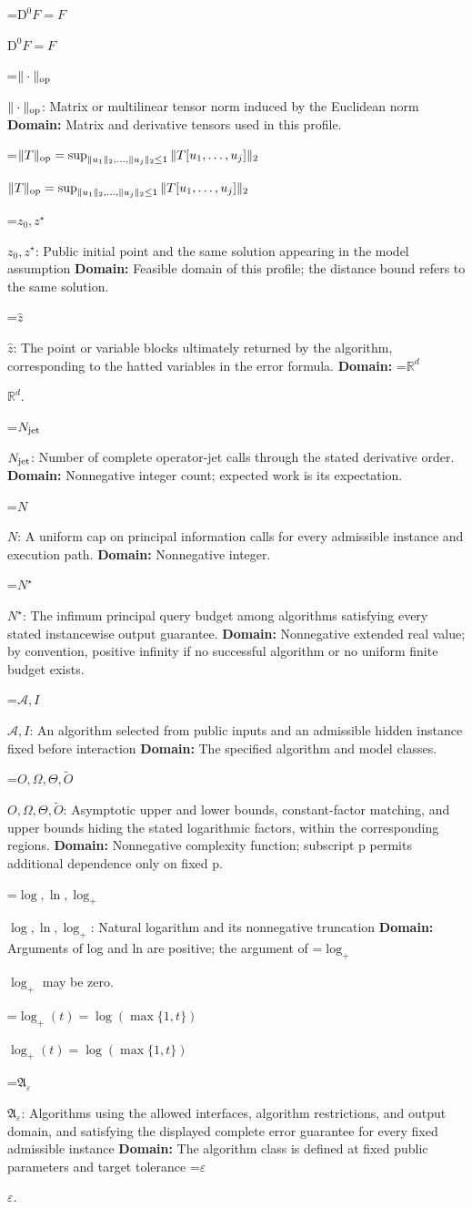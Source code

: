\documentclass[10pt,a4paper]{article}
\newcommand{\AtlasMath}[1]{\par\begingroup\centering\setbox0=\hbox{$\displaystyle #1$}\ifdim\wd0>1.4\linewidth\typeout{ATLAS WIDE FORMULA: \the\wd0}\fi\ifdim\wd0>\linewidth\resizebox{\linewidth}{!}{\box0}\else\box0\fi\par\endgroup}
\newcommand{\AtlasInlineMath}[1]{\begingroup\setbox0=\hbox{$#1$}\ifdim\wd0>.4\linewidth\endgroup\AtlasMath{#1}\else\endgroup$#1$\fi}
\begin{document}
\AtlasInlineMath{\mathrm D^0F=F}

\AtlasInlineMath{\|\cdot\|_{\rm op}}: Matrix or multilinear tensor norm induced by the Euclidean norm \textbf{Domain:} Matrix and derivative tensors used in this profile.

\AtlasInlineMath{\|T\|_{\rm op}=\sup_{\|u_1\|_2,\ldots,\|u_j\|_2\le1}\|T[u_1,\ldots,u_j]\|_2}

\AtlasInlineMath{z_0,z^\star}: Public initial point and the same solution appearing in the model assumption \textbf{Domain:} Feasible domain of this profile; the distance bound refers to the same solution.

\AtlasInlineMath{\widehat z}: The point or variable blocks ultimately returned by the algorithm, corresponding to the hatted variables in the error formula. \textbf{Domain:} \AtlasInlineMath{\mathbb R^d}.

\AtlasInlineMath{N_{\rm jet}}: Number of complete operator-jet calls through the stated derivative order. \textbf{Domain:} Nonnegative integer count; expected work is its expectation.

\AtlasInlineMath{N}: A uniform cap on principal information calls for every admissible instance and execution path. \textbf{Domain:} Nonnegative integer.

\AtlasInlineMath{N^\star}: The infimum principal query budget among algorithms satisfying every stated instancewise output guarantee. \textbf{Domain:} Nonnegative extended real value; by convention, positive infinity if no successful algorithm or no uniform finite budget exists.

\AtlasInlineMath{\mathcal A,I}: An algorithm selected from public inputs and an admissible hidden instance fixed before interaction \textbf{Domain:} The specified algorithm and model classes.

\AtlasInlineMath{O,\Omega,\Theta,\widetilde O}: Asymptotic upper and lower bounds, constant-factor matching, and upper bounds hiding the stated logarithmic factors, within the corresponding regions. \textbf{Domain:} Nonnegative complexity function; subscript p permits additional dependence only on fixed p.

\AtlasInlineMath{\log,\ln,\log_+}: Natural logarithm and its nonnegative truncation \textbf{Domain:} Arguments of log and ln are positive; the argument of \AtlasInlineMath{\log_+} may be zero.

\AtlasInlineMath{\log_+(t)=\log(\max\{1,t\})}

\AtlasInlineMath{\mathfrak A_\varepsilon}: Algorithms using the allowed interfaces, algorithm restrictions, and output domain, and satisfying the displayed complete error guarantee for every fixed admissible instance \textbf{Domain:} The algorithm class is defined at fixed public parameters and target tolerance \AtlasInlineMath{\varepsilon}.
\end{document}
